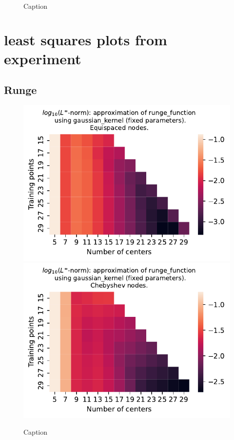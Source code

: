 \documentclass[12pt]{report} %
\begin{document}
\begin{figure}[ht]\caption{Caption}\label{fig:asymptotic-sin_pi_x_sq-TR29}\end{figure}
\clearpage


\section*{least squares plots from experiment}

\subsection*{Runge}

\begin{figure}[ht]
  \centering

  \includegraphics[width=.49\textwidth]{imagenes/experiments/1d/least_squares/opt-runge_function-Kgaussian_kernel-Equi.pdf}
  \includegraphics[width=.49\textwidth]{imagenes/experiments/1d/least_squares/opt-runge_function-Kgaussian_kernel-Cheb.pdf}
  \caption{Caption}
  \label{fig:opt-runge-gaussian}
\end{figure}
\end{document}
